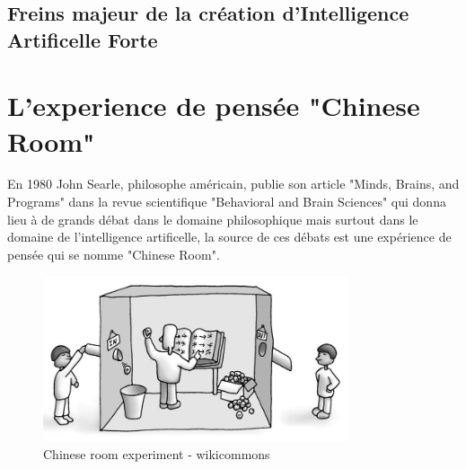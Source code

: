 \subsection{Freins majeur de la création d'Intelligence Artificelle Forte}

%
%
%
\newpage
\section{L'experience de pensée "Chinese Room"}
En 1980 John Searle, philosophe américain, publie son article "Minds, Brains, and Programs" dans la revue 
scientifique "Behavioral and Brain Sciences" qui donna lieu à de grands débat dans le domaine philosophique 
mais surtout dans le domaine de l'intelligence artificelle, 
la source de ces débats est une expérience de pensée qui se nomme "Chinese Room". \newline

\begin{figure}[!h]
    \centering
    \includegraphics[width=0.8\textwidth]{Images/chineseroom}
    \caption{Chinese room experiment - wikicommons}
	\label{fig:chineseroom}
\end{figure}

